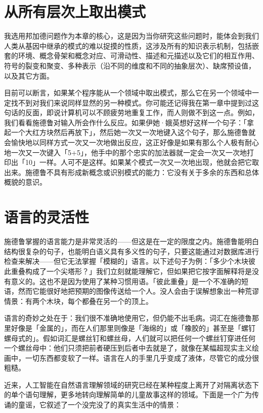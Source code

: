 \documentclass[
  12pt,
  twoside,
  openright,
  oldfontcommands,
]{memoir}
\begin{document}
\section{从所有层次上取出模式}

我选用邦加德问题作为本章的核心，这是因为当你研究这些问题时，能体会到我们人类从基因中继承的模式的难以捉摸的性质，这涉及所有的知识表示机制，包括嵌套的环境、概念骨架和概念对应、可滑动性、描述和元描述以及它们的相互作用、符号的裂变和聚变、多种表示（沿不同的维度和不同的抽象层次）、缺席预设值，以及其它方面。

目前可以断言，如果某个程序能从一个领域中取出模式，那么它在另一个领域中一定找不到对我们来说同样显然的另一种模式。你可能还记得我在第一章中提到过这句话的反面，即说计算机可以不顾疲劳地重复工作，而人则做不到这一点。例如，我们看看施德鲁对输入所会作什么反应。如果伊她·娥英想好这样一个句子：「拿起一个大红方块然后再放下」，然后她一次又一次地键入这个句子，那么施德鲁就会愉快地以同样方式一次又一次地做出反应，这正好像是如果有那么个人极有耐心地一次又一次键入「5+5」，他手中的那个忠实的加法器就一定会一次又一次地打印出「10」一样。人可不是这样。如果某个模式一次又一次地出现，他就会把它取出来。施德鲁不具有形成新概念或识别模式的能力：它没有关于多余的东西和总体概貌的意识。

\section{语言的灵活性}

施德鲁掌握的语言能力是非常灵活的------但这是在一定的限度之内。施德鲁能明白结构很复杂的句子，也能明白语义具有多义性的句子，只要这能通过对数据库进行检查来解决------但它无法掌握「模糊的」语言。以下述句子为例：「多少个木块彼此重叠构成了一个尖塔形？」我们立刻就能理解它，但如果把它按字面解释将是没有意义的。这也不是因为使用了某种习惯用语。「彼此重叠」是一个不准确的短语，然而它能很好地把预期的图像传送给一个人。没人会由于误解想象出一种荒谬情景：有两个木块，每个都叠在另一个的顶上。

语言的奇妙之处在于：我们很不准确地使用它，但仍能不出毛病。词汇在施德鲁那里好像是「金属的」，而在人们那里则像是「海绵的」或「橡胶的」甚至是「螺钉螺母式的」。假如词汇是螺丝钉和螺丝母，人们就可以把任何一个螺丝钉穿进任何一个螺丝母中：他们只须把前者硬压到后者中去就是了，就像在某幅超现实主义绘画中，一切东西都变软了一样。语言在人的手里几乎变成了液体，尽管它的成分很粗糙。

近来，人工智能在自然语言理解领域的研究已经在某种程度上离开了对隔离状态下的单个语句理解，更多地转向理解简单的儿童故事这样的领域。下面是一个广为传诵的童谣，它叙述了一个没完没了的真实生活中的情景：
\end{document}
